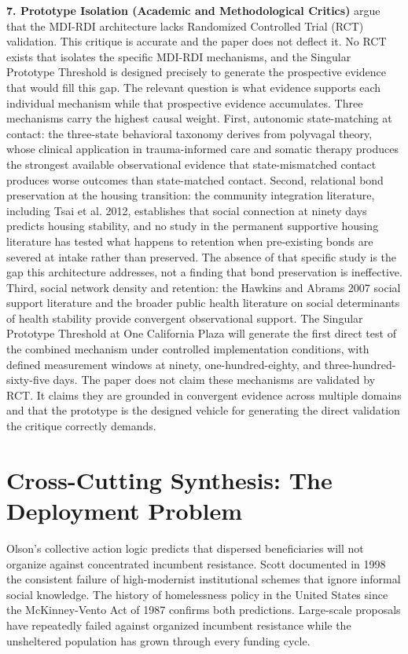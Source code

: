 \documentclass[12pt, letterpaper]{article}
\begin{document}
\textbf{7. Prototype Isolation (Academic and Methodological Critics)} argue that the MDI-RDI architecture lacks Randomized Controlled Trial (RCT) validation. This critique is accurate and the paper does not deflect it. No RCT exists that isolates the specific MDI-RDI mechanisms, and the Singular Prototype Threshold is designed precisely to generate the prospective evidence that would fill this gap. The relevant question is what evidence supports each individual mechanism while that prospective evidence accumulates. Three mechanisms carry the highest causal weight. First, autonomic state-matching at contact: the three-state behavioral taxonomy derives from polyvagal theory, whose clinical application in trauma-informed care and somatic therapy produces the strongest available observational evidence that state-mismatched contact produces worse outcomes than state-matched contact. Second, relational bond preservation at the housing transition: the community integration literature, including Tsai et al. 2012, establishes that social connection at ninety days predicts housing stability, and no study in the permanent supportive housing literature has tested what happens to retention when pre-existing bonds are severed at intake rather than preserved. The absence of that specific study is the gap this architecture addresses, not a finding that bond preservation is ineffective. Third, social network density and retention: the Hawkins and Abrams 2007 social support literature and the broader public health literature on social determinants of health stability provide convergent observational support. The Singular Prototype Threshold at One California Plaza will generate the first direct test of the combined mechanism under controlled implementation conditions, with defined measurement windows at ninety, one-hundred-eighty, and three-hundred-sixty-five days. The paper does not claim these mechanisms are validated by RCT. It claims they are grounded in convergent evidence across multiple domains and that the prototype is the designed vehicle for generating the direct validation the critique correctly demands.

\section{Cross-Cutting Synthesis: The Deployment Problem}
 Olson's collective action logic predicts that dispersed beneficiaries will not organize against concentrated incumbent resistance. Scott documented in 1998 the consistent failure of high-modernist institutional schemes that ignore informal social knowledge. The history of homelessness policy in the United States since the McKinney-Vento Act of 1987 confirms both predictions. Large-scale proposals have repeatedly failed against organized incumbent resistance while the unsheltered population has grown through every funding cycle.
\end{document}
